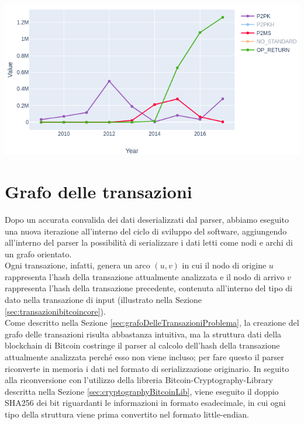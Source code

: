 {\centering
\vspace{15pt}
\includegraphics[scale=0.5]{images/OP_RETUTN_chart.png}
\vspace{10pt}
\par}


\section{Grafo delle transazioni} \label{sec:solGraphTX}

Dopo un accurata convalida dei dati deserializzati dal parser, abbiamo eseguito una nuova iterazione all'interno del ciclo di sviluppo del software, aggiungendo all'interno del parser la possibilità di serializzare i dati letti come nodi e archi di un grafo orientato.\\
Ogni transazione, infatti, genera un arco $(u, v)$ in cui il nodo di origine $u$ rappresenta l'hash della transazione attualmente analizzata e il nodo di arrivo $v$ rappresenta l'hash della transazione precedente, contenuta all'interno del tipo di dato  nella transazione di input (illustrato nella Sezione \ref{sec:transazionibitcoincore}).\\
Come descritto nella Sezione \ref{sec:grafoDelleTransazioniProblema}, la creazione del grafo delle transazioni risulta abbastanza intuitiva, ma la struttura dati della blockchain di Bitcoin costringe il parser al calcolo dell'hash della transazione attualmente analizzata perché esso non viene incluso; per fare questo il parser riconverte in memoria i dati nel formato di serializzazione originario.
In seguito alla riconversione con l'utilizzo della libreria Bitcoin-Cryptography-Library descritta nella Sezione \ref{sec:cryptographyBitcoinLib}, viene eseguito il doppio SHA256 dei bit riguardanti le informazioni in formato esadecimale, in cui ogni tipo della struttura viene prima convertito nel formato little-endian.\\

